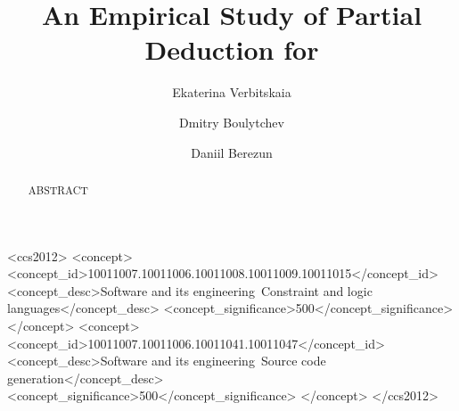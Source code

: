 \documentclass[acmlarge]{acmart}
\begin{document}
\title{An Empirical Study of Partial Deduction for \mk{}}

\author{Ekaterina Verbitskaia}

\author{Dmitry Boulytchev}

\author{Daniil Berezun}



\renewcommand{\shortauthors}{Verbitskaia, Berezun and Boulytchev.}

\begin{abstract}
  ABSTRACT
\end{abstract}

\begin{CCSXML}
  <ccs2012>
  <concept>
  <concept_id>10011007.10011006.10011008.10011009.10011015</concept_id>
  <concept_desc>Software and its engineering~Constraint and logic languages</concept_desc>
  <concept_significance>500</concept_significance>
  </concept>
  <concept>
  <concept_id>10011007.10011006.10011041.10011047</concept_id>
  <concept_desc>Software and its engineering~Source code generation</concept_desc>
  <concept_significance>500</concept_significance>
  </concept>
  </ccs2012>
\end{CCSXML}


\maketitle








\end{document}
